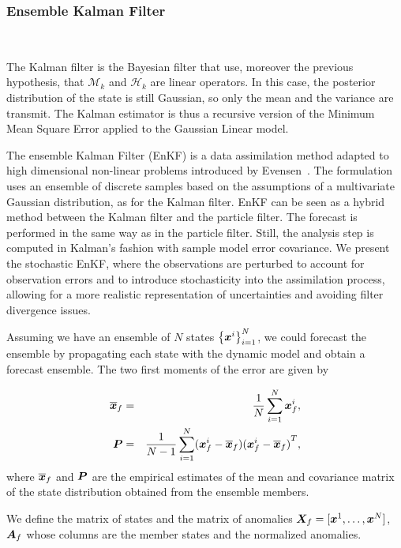 \subsubsection{Ensemble Kalman Filter}~{\label{enkf}}

The Kalman filter \cite{kalman_new_1960} is the Bayesian filter that use, moreover the previous hypothesis, that  $\mathcal M_k$ and $\mathcal H_k$ are linear operators. In this case, the posterior distribution of the state is still Gaussian, so only the mean and the variance are transmit.
The Kalman estimator is thus a recursive version of the Minimum Mean Square Error applied to the Gaussian Linear model.

The ensemble Kalman Filter (EnKF) is a data assimilation method adapted to high dimensional non-linear problems introduced by Evensen~\cite{evensen_sequential_1994}. The formulation uses an ensemble of discrete samples based on the assumptions of a multivariate Gaussian distribution, as for the Kalman filter. EnKF can be seen as a hybrid method between the Kalman filter and the particle filter. The forecast is performed in the same way as in the particle filter. Still, the analysis step is computed in Kalman's fashion with sample model error covariance.
We present the stochastic EnKF, where the observations are perturbed to account for observation errors and to introduce stochasticity into the assimilation process, allowing for a more realistic representation of uncertainties and avoiding filter divergence issues.

Assuming we have an ensemble of $N$ states $\left\{\bm {\bm{x}}^i \right\}_{i=1}^N$, we could forecast the ensemble by propagating each state with the dynamic model and obtain a forecast ensemble.
The two first moments of the error are given by

\begin{eqnarray*}
    \overline{\bm{x}}_f &=& \frac{1}{N} \sum_{i = 1}^{N} \bm{x}^i_f, \\
    \bm{P} &=& \frac{1}{N-1} \sum_{i = 1}^{N} (\bm{x}^i_f - \overline{\bm{x}}_f){(\bm{x}^i_f - \overline{\bm{x}}_f)}^T,
\end{eqnarray*}
where $\overline{\bm{x}}_f$ and $\bm{P}$ are the empirical estimates of the mean and covariance matrix of the state distribution obtained from the ensemble members.

We define the matrix of states and the matrix of anomalies $\bm{X}_f = [\bm{x}^1, \dots, \bm{x}^N]$, $\bm A_f$ whose columns are the member states and the normalized anomalies.

